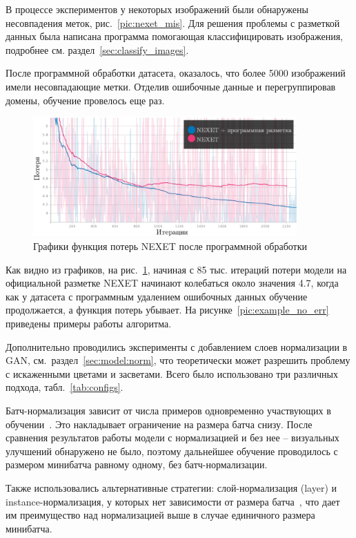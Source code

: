\documentclass[11pt,a4paper]{extarticle}
\begin{document}
{			В процессе экспериментов у некоторых изображений были обнаружены несовпадения меток, рис.~\ref{pic:nexet_mis}. 
			Для решения проблемы с разметкой данных была написана программа помогающая классифицировать изображения, подробнее см. раздел~\ref{sec:classify_images}.

			После программной обработки датасета, оказалось, что более 5000 изображений имели несовпадающие метки.
			Отделив ошибочные данные и перегруппировав домены, обучение провелось еще раз.
			
			\begin{figure}[ht]
				\centering
				\includegraphics[width=0.9\textwidth]{img/loss_gen_no_err}
				\caption{Графики функция потерь NEXET после программной обработки}
				\label{pic:loss_gen_no_err}
			\end{figure}

			\noindent
			Как видно из графиков, на рис.~\ref{pic:loss_gen_no_err}, начиная с 85 тыс. итераций потери модели на официальной разметке NEXET начинают колебаться около значения 4.7, когда как у датасета с программным удалением ошибочных данных обучение продолжается, а функция потерь убывает. 
			На рисунке~\ref{pic:example_no_err} приведены примеры работы алгоритма.


			Дополнительно проводились эксперименты с добавлением слоев нормализации в GAN, см.~раздел~\ref{sec:model:norm}, что теоретически может разрешить проблему с искаженными цветами и засветами.
			Всего было использовано три различных подхода, табл.~\ref{tab:configs}.

			Батч-нормализация зависит от числа примеров одновременно участвующих в обучении~\cite{n_batch}. Это накладывает ограничение на размера батча снизу.
			После сравнения результатов работы модели с нормализацией и без нее -- визуальных улучшений обнаружено не было, поэтому дальнейшее обучение проводилось с размером минибатча равному одному, без батч-нормализации.

			Также использовались альтернативные стратегии: слой-нормализация (layer) и instance-нормализация, у которых нет зависимости от размера батча~\cite{n_layer,n_instance}, что дает им преимущество над нормализацией выше в случае единичного размера минибатча.
			
}
\end{document}
